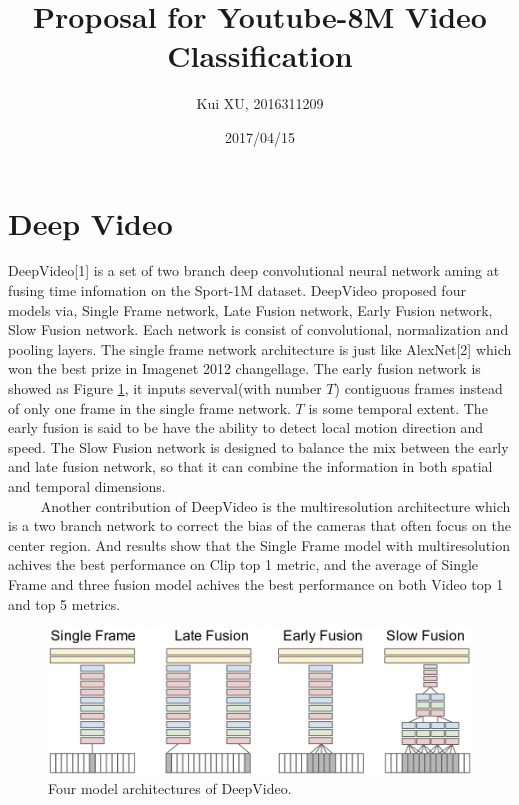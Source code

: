 \documentclass[a4paper]{article}
\title{Proposal for Youtube-8M Video Classification }
\author{Kui XU, 2016311209}
\date{2017/04/15}
\begin{document}
\maketitle

\section{Deep Video}

DeepVideo[1] is a set of two branch deep convolutional neural network aming at fusing time infomation on the Sport-1M dataset. DeepVideo proposed four models via, Single Frame network, Late Fusion network, Early Fusion network, Slow Fusion network. Each network is consist of convolutional, normalization and pooling layers. The single frame network architecture is just like AlexNet[2] which won the best prize in Imagenet 2012 changellage. The early fusion network is showed as Figure \ref{deepvideo}, it inputs severval(with number $T$) contiguous frames instead of only one frame in the single frame network. $T$ is some temporal extent. The early fusion is said to be have the ability to detect local motion direction and speed. 
The Slow Fusion network is designed to balance the mix between the early and late fusion network, so that it can combine the information in both spatial and temporal dimensions.\\
$\qquad$  Another contribution of DeepVideo is the multiresolution architecture which is a two branch network to correct the bias of the cameras that often focus on the center region. And results show that the Single Frame model with multiresolution achives the best performance on Clip top 1 metric, and the average of Single Frame and three fusion model achives the best performance on both Video top 1 and top 5 metrics. 
\begin{figure}[!htbp]
\begin{center}
\includegraphics[width=12cm]{deepvideo.jpg}
\end{center}
\caption{Four model architectures of DeepVideo.}\label{deepvideo}
\end{figure}
\end{document}
